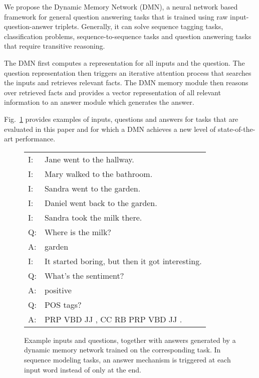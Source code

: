 \documentclass{article}
\begin{document}
We propose the Dynamic Memory Network (DMN), a neural network based framework for general question answering tasks that is trained using raw input-question-answer triplets. Generally, it can solve sequence tagging tasks, classification problems, sequence-to-sequence tasks and question answering tasks that require transitive reasoning. 

The DMN first computes a representation for all inputs and the question. The question representation then triggers an iterative attention process that searches the inputs and retrieves relevant facts. The DMN memory module then reasons over retrieved facts and provides a vector representation of all relevant information to an answer module which generates the answer. 

Fig.~\ref{fig:example} provides examples of inputs, questions and answers for tasks that are evaluated in this paper and for which a DMN achieves a new level of state-of-the-art performance.

\begin{figure}
\begin{center}
\begin{tabular}{l l }
 I: &  Jane went to the hallway.       \\ I: &  Mary walked to the bathroom.    \\ I: &  Sandra went to the garden.      \\ I: &  Daniel went back to the garden. \\ I: &  Sandra took the milk there.     \\ Q: &  Where is the milk?              \\ A: &  garden                          \\ I: &  It started boring, but then it got interesting.             \\ Q: &  What's the sentiment?           \\ A: &  positive                        \\ Q: &  POS tags?          \\ A: &  PRP VBD JJ , CC RB PRP VBD JJ .
\end{tabular}
\end{center}
\label{fig:example}
\caption{Example inputs and questions, together with answers generated by a dynamic memory network trained on the corresponding task. In sequence modeling tasks, an answer mechanism is triggered at each input word instead of only at the end.}
\end{figure}
\end{document}

